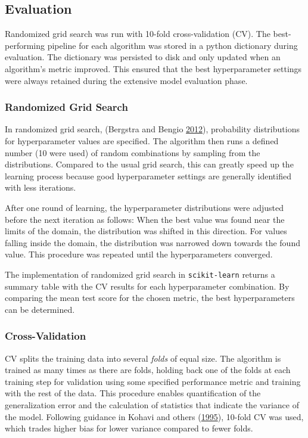 \documentclass[
  11pt,
  a4paper,
  DIV=12,captions=tableheading,oneside,titlepage]{scrbook}
\begin{document}
\hypertarget{evaluation}{%
\subsection{Evaluation}\label{evaluation}}

Randomized grid search was run with 10-fold cross-validation (CV). The best-performing pipeline for each algorithm was stored in a python dictionary during evaluation. The dictionary was persisted to disk and only updated when an algorithm's metric improved. This ensured that the best hyperparameter settings were always retained during the extensive model evaluation phase.

\hypertarget{randomized-grid-search}{%
\subsubsection{Randomized Grid Search}\label{randomized-grid-search}}

In randomized grid search, (Bergstra and Bengio \protect\hyperlink{ref-bergstra2012random}{2012}), probability distributions for hyperparameter values are specified. The algorithm then runs a defined number (10 were used) of random combinations by sampling from the distributions. Compared to the usual grid search, this can greatly speed up the learning process because good hyperparameter settings are generally identified with less iterations.

After one round of learning, the hyperparameter distributions were adjusted before the next iteration as follows: When the best value was found near the limits of the domain, the distribution was shifted in this direction. For values falling inside the domain, the distribution was narrowed down towards the found value. This procedure was repeated until the hyperparameters converged.

The implementation of randomized grid search in \texttt{scikit-learn} returns a summary table with the CV results for each hyperparameter combination. By comparing the mean test score for the chosen metric, the best hyperparameters can be determined.

\hypertarget{cross-validation}{%
\subsubsection{Cross-Validation}\label{cross-validation}}

CV splits the training data into several \emph{folds} of equal size. The algorithm is trained as many times as there are folds, holding back one of the folds at each training step for validation using some specified performance metric and training with the rest of the data. This procedure enables quantification of the generalization error and the calculation of statistics that indicate the variance of the model. Following guidance in Kohavi and others (\protect\hyperlink{ref-kohavi1995study}{1995}), 10-fold CV was used, which trades higher bias for lower variance compared to fewer folds.
\end{document}
